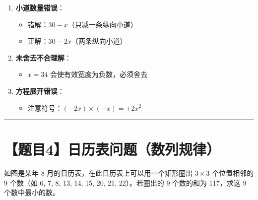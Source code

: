 \documentclass[UTF8]{ctexart}
\newenvironment{redenv}{\color{red}}{}
\newcommand{\problemrule}{\noindent\rule{\textwidth}{1.5pt}\vspace{-0.8em}}
\begin{document}
\begin{redenv}
\begin{enumerate}[label=\arabic*.]
    \item \textbf{小道数量错误}：
    \begin{itemize}
        \item 错解：$30 - x$（只减一条纵向小道）
        \item 正解：$30 - 2x$（两条纵向小道）
    \end{itemize}
    
    \item \textbf{未舍去不合理解}：
    \begin{itemize}
        \item $x = 34$ 会使有效宽度为负数，必须舍去
    \end{itemize}
    
    \item \textbf{方程展开错误}：
    \begin{itemize}
        \item 注意符号：$(-2x) \times (-x) = +2x^2$
    \end{itemize}
\end{enumerate}
\end{redenv}

\newpage

\problemrule
\section*{【题目4】日历表问题（数列规律）}
如图是某年 8 月的日历表，在此日历表上可以用一个矩形圈出 $3 \times 3$ 个位置相邻的 9 个数（如 6, 7, 8, 13, 14, 15, 20, 21, 22）。若圈出的 9 个数的和为 117，求这 9 个数中最小的数。
\end{document}

